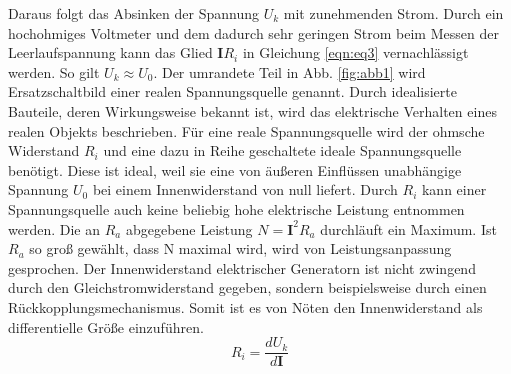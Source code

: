 Daraus folgt das Absinken der Spannung $U_k$ mit zunehmenden Strom.
Durch ein hochohmiges Voltmeter und dem dadurch sehr geringen Strom beim Messen der Leerlaufspannung kann das Glied $\symbf{I} R_i$ in Gleichung \ref{eqn:eq3} vernachlässigt werden.
So gilt $U_k \approx U_0$.
Der umrandete Teil in Abb. \ref{fig:abb1} wird Ersatzschaltbild einer realen Spannungsquelle genannt.
Durch idealisierte Bauteile, deren Wirkungsweise bekannt ist, wird das elektrische Verhalten eines realen Objekts beschrieben.
Für eine reale Spannungsquelle wird der ohmsche Widerstand $R_i$ und eine dazu in Reihe geschaltete ideale Spannungsquelle benötigt.
Diese ist ideal, weil sie eine von äußeren Einflüssen unabhängige Spannung $U_0$ bei einem Innenwiderstand von null liefert.
Durch $R_i$ kann einer Spannungsquelle auch keine beliebig hohe elektrische Leistung entnommen werden.
Die an $R_a$ abgegebene Leistung $N = \symbf{I}^2 R_a$ durchläuft ein Maximum.
Ist $R_a$ so groß gewählt, dass N maximal wird, wird von Leistungsanpassung gesprochen.
Der Innenwiderstand elektrischer Generatorn ist nicht zwingend durch den Gleichstromwiderstand gegeben, sondern beispielsweise durch einen Rückkopplungsmechanismus.
Somit ist es von Nöten den Innenwiderstand als differentielle Größe einzuführen.
\begin{equation}
  R_i = \frac{dU_k}{d\symbf{I}}
  \label{eqn:eq4}
\end{equation}
